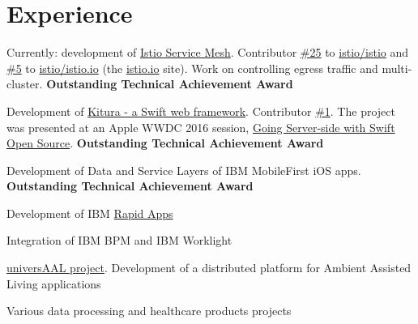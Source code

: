 \documentclass[]{deedy-resume}
\begin{document}
\hfill
\begin{minipage}[t]{0.66\textwidth}


\section{Experience}

\vspace{\topsep} %
\begin{tightemize}
\item Currently: development of \href{https://istio.io}{Istio Service Mesh}.
Contributor \href{https://github.com/istio/istio/graphs/contributors}{\#25} to
\href{https://github.com/istio/istio}{istio/istio} and
\href{https://github.com/istio/istio.io/graphs/contributors}{\#5} to
\href{https://github.com/istio/istio.io}{istio/istio.io}
(the \href{https://istio.io}{istio.io} site).
Work on controlling egress traffic and multi-cluster. \textbf{Outstanding Technical Achievement Award}
\item Development of \href{https://github.com/IBM-Swift/Kitura}{Kitura - a Swift web framework}. Contributor \href{https://github.com/IBM-Swift/Kitura/graphs/contributors}{\#1}. The project was presented at an Apple WWDC 2016 session, \href{https://developer.apple.com/videos/play/wwdc2016/415/}{Going Server-side with Swift Open Source}. \textbf{Outstanding Technical Achievement Award}
\item Development of Data and Service Layers of IBM MobileFirst iOS apps.  \textbf{Outstanding Technical Achievement Award}
\item Development of IBM \href{https://www.youtube.com/watch?v=wKHfEx988mc}{Rapid Apps}
\item Integration of IBM BPM and IBM Worklight
\end{tightemize}
\sectionsep

\vspace{\topsep} %
\begin{tightemize}
\item \href{http://universaal.sintef9013.com/index.php/en/}{universAAL project}. Development of a distributed platform for Ambient Assisted Living applications
\item Various data processing and healthcare products projects
\end{tightemize}
\sectionsep


\end{minipage}
\end{document}
